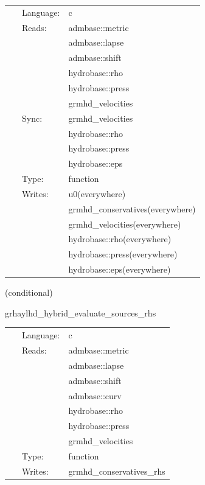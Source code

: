 \documentclass{article}
\begin{document}
 \begin{tabular*}{160mm}{cll} 
~ & Language:  & c \\ 
~ & Reads:  & admbase::metric \\ 
~& ~ &admbase::lapse\\ 
~& ~ &admbase::shift\\ 
~& ~ &hydrobase::rho\\ 
~& ~ &hydrobase::press\\ 
~& ~ &grmhd\_velocities\\ 
~ & Sync:  & grmhd\_velocities \\ 
~& ~ &hydrobase::rho\\ 
~& ~ &hydrobase::press\\ 
~& ~ &hydrobase::eps\\ 
~ & Type:  & function \\ 
~ & Writes:  & u0(everywhere) \\ 
~& ~ &grmhd\_conservatives(everywhere)\\ 
~& ~ &grmhd\_velocities(everywhere)\\ 
~& ~ &hydrobase::rho(everywhere)\\ 
~& ~ &hydrobase::press(everywhere)\\ 
~& ~ &hydrobase::eps(everywhere)\\ 
\end{tabular*} 


\vspace{5mm}

   (conditional) 

\hspace{5mm} grhaylhd\_hybrid\_evaluate\_sources\_rhs 

\hspace{5mm}{\it hybrid version of grhaylhd\_evaluate\_sources\_rhs } 


\hspace{5mm}

 \begin{tabular*}{160mm}{cll} 
~ & Language:  & c \\ 
~ & Reads:  & admbase::metric \\ 
~& ~ &admbase::lapse\\ 
~& ~ &admbase::shift\\ 
~& ~ &admbase::curv\\ 
~& ~ &hydrobase::rho\\ 
~& ~ &hydrobase::press\\ 
~& ~ &grmhd\_velocities\\ 
~ & Type:  & function \\ 
~ & Writes:  & grmhd\_conservatives\_rhs \\ 
\end{tabular*} 
\end{document}
